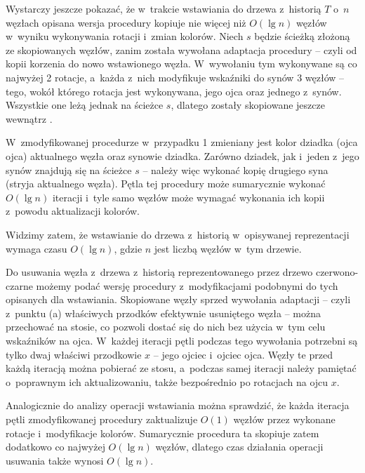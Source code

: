 Wystarczy jeszcze pokazać, że w~trakcie wstawiania do drzewa z~historią $T$ o~$n$ węzłach opisana wersja procedury  kopiuje nie więcej niż $O(\lg n)$ węzłów w~wyniku wykonywania rotacji i~zmian kolorów.
Niech $s$ będzie ścieżką złożoną ze skopiowanych węzłów, zanim została wywołana adaptacja procedury  -- czyli od kopii korzenia do nowo wstawionego węzła.
W~wywołaniu tym wykonywane są co najwyżej 2 rotacje, a~każda z~nich modyfikuje wskaźniki do synów 3 węzłów -- tego, wokół którego rotacja jest wykonywana, jego ojca oraz jednego z~synów.
Wszystkie one leżą jednak na ścieżce $s$, dlatego zostały skopiowane jeszcze wewnątrz .

W~zmodyfikowanej procedurze  w~przypadku 1 zmieniany jest kolor dziadka (ojca ojca) aktualnego węzła oraz synowie dziadka.
Zarówno dziadek, jak i~jeden z~jego synów znajdują się na ścieżce $s$ -- należy więc wykonać kopię drugiego syna (stryja aktualnego węzła).
Pętla tej procedury może sumarycznie wykonać $O(\lg n)$ iteracji i~tyle samo węzłów może wymagać wykonania ich kopii z~powodu aktualizacji kolorów.

Widzimy zatem, że wstawianie do drzewa z~historią w~opisywanej reprezentacji wymaga czasu $O(\lg n)$, gdzie $n$ jest liczbą węzłów w~tym drzewie.

Do usuwania węzła z~drzewa z~historią reprezentowanego przez drzewo czerwono-czarne możemy podać wersję procedury  z~modyfikacjami podobnymi do tych opisanych dla wstawiania.
Skopiowane węzły sprzed wywołania adaptacji  -- czyli z~punktu (a) właściwych przodków efektywnie usuniętego węzła -- można przechować na stosie, co pozwoli dostać się do nich bez użycia w~tym celu wskaźników na ojca.
W~każdej iteracji pętli  podczas tego wywołania potrzebni są tylko dwaj właściwi przodkowie $x$ -- jego ojciec i~ojciec ojca.
Węzły te przed każdą iteracją można pobierać ze stosu, a~podczas samej iteracji należy pamiętać o~poprawnym ich aktualizowaniu, także bezpośrednio po rotacjach na ojcu $x$.

Analogicznie do analizy operacji wstawiania można sprawdzić, że każda iteracja pętli zmodyfikowanej procedury  zaktualizuje $O(1)$ węzłów przez wykonane rotacje i~modyfikacje kolorów.
Sumarycznie procedura ta skopiuje zatem dodatkowo co najwyżej $O(\lg n)$ węzłów, dlatego czas działania operacji usuwania także wynosi $O(\lg n)$.
